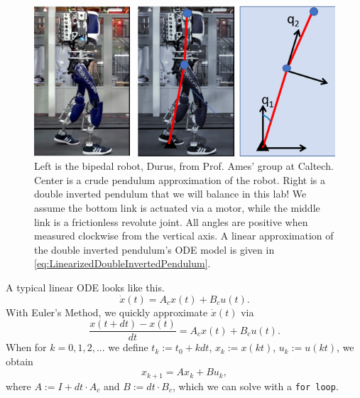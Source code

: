  \begin{figure}[hbt!]%
	\centering
\includegraphics[width=0.75\columnwidth]{graphics/Chap09/Robot2PendulaVer02.png}
    \caption[]{Left is the bipedal robot, Durus, from Prof. Ames' group at Caltech. Center is a crude pendulum approximation of the robot. Right is a double inverted pendulum that we will balance in this lab! We assume the bottom link is actuated via a motor, while the middle link is a frictionless revolute joint. All angles are positive when measured clockwise from the vertical axis. A linear approximation of the double inverted pendulum's ODE model is given in \eqref{eq:LinearizedDoubleInvertedPendulum}.}
    \label{fig:FromRobots2Pendula}
\end{figure} 

\begin{tcolorbox}[title=\textbf{Euler's Method takes us from a Linear ODE to Iterating Linear Equations}]

A typical linear ODE looks like this.
 $$\dot{x}(t) = A_c x(t) + B_c u(t).$$
 With Euler's Method, we quickly approximate $\dot{x}(t)$ via
 $$  \frac{x(t + dt) - x(t)}{dt} = A_c x(t) + B_c u(t).$$
When for $k= 0, 1, 2, ...$ we define $t_k := t_0 + k dt$, $x_k := x(kt)$, $u_k := u(kt)$, we obtain 
$$  x_{k+1}  = A x_k + B u_k,$$
where $A:= I + dt \cdot A_c$ and $B:= dt \cdot B_c$, 
which we can solve with a \texttt{for\,loop}.
\end{tcolorbox}

